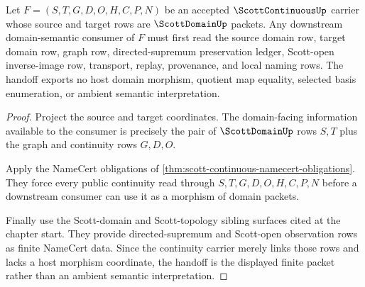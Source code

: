 \begin{theorem}
\label{thm:scott-continuous-domain-handoff}
Let $F=(S,T,G,D,O,H,C,P,N)$ be an accepted $\ScottContinuousUp$ carrier whose source and target rows are $\ScottDomainUp$ packets. Any downstream domain-semantic consumer of $F$ must first read the source domain row, target domain row, graph row, directed-supremum preservation ledger, Scott-open inverse-image row, transport, replay, provenance, and local naming rows. The handoff exports no host domain morphism, quotient map equality, selected basis enumeration, or ambient semantic interpretation.
\end{theorem}
\begin{proof}
Project the source and target coordinates. The domain-facing information available to the consumer is precisely the pair of $\ScottDomainUp$ rows $S,T$ plus the graph and continuity rows $G,D,O$.

Apply the NameCert obligations of \autoref{thm:scott-continuous-namecert-obligations}. They force every public continuity read through $S,T,G,D,O,H,C,P,N$ before a downstream consumer can use it as a morphism of domain packets.

Finally use the Scott-domain and Scott-topology sibling surfaces cited at the chapter start. They provide directed-supremum and Scott-open observation rows as finite NameCert data. Since the continuity carrier merely links those rows and lacks a host morphism coordinate, the handoff is the displayed finite packet rather than an ambient semantic interpretation.
\end{proof}


\begin{closurestatus}{\ScottContinuousUp}
  \theoryclosure{\seedClosure}
  \formalstatus{\unformalizedV}
\end{closurestatus}
